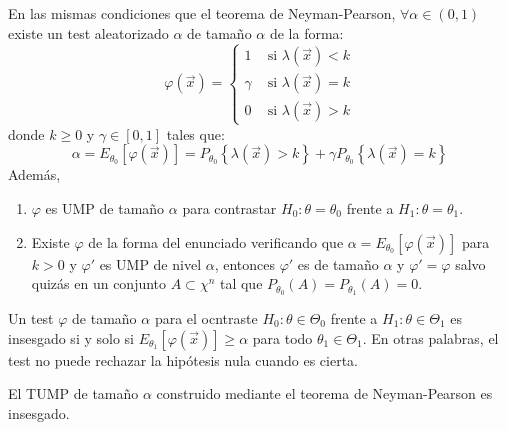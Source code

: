 \begin{teorema}
    En las mismas condiciones que el teorema de Neyman-Pearson, $\forall \alpha \in (0,1)$ existe un test aleatorizado $\alpha$ de tamaño $\alpha$ de la forma:
    $$\varphi(\vec{x}) = \begin{cases} 1 & \text{ si } \lambda(\vec{x}) < k \\ \gamma  & \text{ si } \lambda(\vec{x}) =  k\\ 0 & \text{ si } \lambda(\vec{x}) > k \end{cases}$$
    donde $k \geq 0$ y $\gamma \in [0,1]$ tales que: 
    $$\alpha = E_{\theta_0}[\varphi(\vec{x})] = P_{\theta_0}\left\{\lambda(\vec{x}) > k \right\} + \gamma P_{\theta_0}\left\{\lambda(\vec{x}) = k \right\}$$
    Además, 
    \begin{enumerate}
        \item $\varphi$ es UMP de tamaño $\alpha$ para contrastar $H_0: \theta = \theta_0$ frente a $H_1: \theta = \theta_1$.
        \item Existe $\varphi$ de la forma del enunciado verificando que $\alpha = E_{\theta_0}[\varphi(\vec{x})]$ para $k > 0$ y $\varphi\prime$ es UMP de nivel $\alpha$, entonces $\varphi\prime$ es de tamaño $\alpha$ y $\varphi\prime = \varphi$ salvo quizás en un conjunto $A \subset \chi^n$ tal que $P_{\theta_0}(A) = P_{\theta_1}(A) = 0$.
    \end{enumerate}
\end{teorema}

\begin{definición}
    Un test $\varphi$ de tamaño $\alpha$ para el ocntraste $H_0: \theta \in \Theta_0$ frente a $H_1: \theta \in \Theta_1$ es insesgado si y solo si $E_{\theta_1}[\varphi(\vec{x})] \geq \alpha$ para todo $\theta_1 \in \Theta_1$.
    En otras palabras, el test no puede rechazar la hipótesis nula cuando es cierta.
\end{definición}

\begin{corolario}
    El TUMP de tamaño $\alpha$ construido mediante el teorema de Neyman-Pearson es insesgado. 
\end{corolario}

